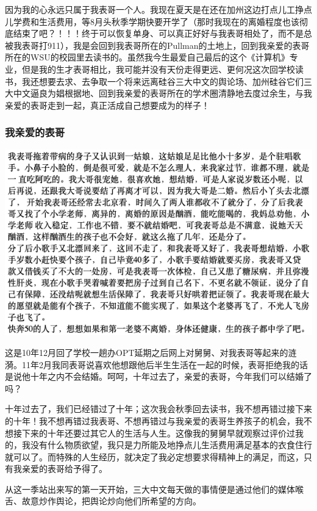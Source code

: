 \documentclass[9pt, b5paper]{article}
\begin{document}
因为我的心永远只属于我表哥一个人。我现在夏天是在还在加州这边打点儿工挣点儿学费和生活费用，等8月头秋季学期快要开学了（那时我现在的离婚程度也该彻底结束了吧？！！！终于可以恢复单身、可以真正好好与我表哥相处了，而不是总被我表哥打911），我是会回到我表哥所在的Pullman的土地上，回到我亲爱的表哥所在的WSU的校园里去读书的。虽然我今生最爱自己最后的这个《计算机》专业，但是我的生才表哥相比，我可能并没有天份走得更远、更何况这次回学校读书，我还想要去求、去争取一个将来远离硅谷三大中文的舆论场、加州硅谷它们三大中文逼良为娼根据地、回到我亲爱的表哥所在的学术圈清静地去度过余生，与我亲爱的表哥走到一起，真正活成自己想要成为的样子！

\subsubsection{我亲爱的表哥}
\label{sec:org5b125c5}

\begin{center}
\includegraphics[width=.9\linewidth]{./pic/readme_20210528_231147.png}
\end{center}

这是10年12月回了学校一趟办OPT延期之后网上对舅舅、对我表哥等起来的涟漪。11年2月我同表哥说喜欢他想跟他后半生生活在一起的时候，表哥拒绝我的话是说他十年之内不会结婚。呵呵，十年过去了，亲爱的表哥，今年我们可以结婚了吗？

十年过去了，我们已经错过了十年；这次我会秋季回去读书，我不想再错过接下来的十年！我不想再错过我表哥、不想再错过与我亲爱的表哥生养孩子的机会，我不想接下来的十年还要过其它人的生活与人生。这像我的舅舅早就观察过评价过我的，我没有什么物质欲望，我只是力所能及地挣点儿生活费用满足基本的衣食住行就可以了。而特殊的人生经历，就决定了我必定想要求得精神上的满足，而这，只有我亲爱的表哥给予得了。 

从这一季站出来写的第一天开始，三大中文每天做的事情便是通过他们的媒体喉舌、故意炒作舆论，把舆论炒向他们所希望的方向。
\end{document}
